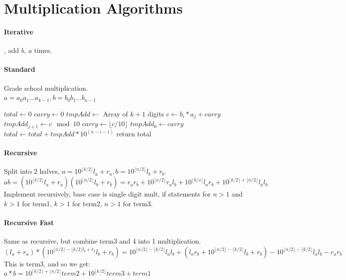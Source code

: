 \section{Multiplication Algorithms}
\paragraph{Iterative}, add $b$, $a$ times.
\vspace{-7 pt}
\paragraph{Standard} Grade school multiplication.\\
$a=a_0a_1\ldots a_{k-1},b=b_0b_1\ldots b_{n-1}$
\begin{algorithmic}
	\State $total \gets 0$
		\State $carry \gets 0$
		\State $tmpAdd \gets$ Array of $k+1$ digits
			\State $c\gets b_i*a_j+carry$
			\State $tmpAdd_{j+1}\gets c \mod 10$
			\State $carry \gets \lfloor c/10 \rfloor$
		\EndFor
		\State $tmpAdd_0 \gets carry$
		\State $total \gets total+tmpAdd*10^{(n-i-1)}$
	\EndFor
	\State return total
\end{algorithmic}
\vspace{-7 pt}
\paragraph{Recursive} Split into 2 halves, $a=10^{\lfloor k/2 \rfloor }l_a+r_a,b=10^{\lfloor n/2 \rfloor }l_b+r_b$.
\\$ab=(10^{\lfloor k/2 \rfloor}l_a+r_a)(10^{\lfloor n/2 \rfloor }l_b+r_b)=r_a r_b+10^{\lfloor n/2 \rfloor}r_al_b+10^{\lfloor k/s \rfloor}l_ar_b+10^{\lfloor k/2 \rfloor + \lfloor n/2 \rfloor }l_al_b$
\\ Implement recursively, base case is single digit mult, if statements for $n>1$ and $k>1$ for term1, $k>1$ for term2, $n>1$ for term3.
\vspace{-7 pt}
\paragraph{Recursive Fast} Same as recursive, but combine term3 and 4 into 1 multiplication.
\\$(l_a+r_a)*(10^{\lfloor n/2 \rfloor - \lfloor k/2 \rfloor l_b+r_b}l_b+r_b)=10^{\lfloor n/2 \rfloor - \lfloor k/2 \rfloor}l_al_b+(l_ar_b+10^{\lfloor n/2 \rfloor - \lfloor k/2 \rfloor}l_b+r_b)-10^{\lfloor n/2 \rfloor - \lfloor k/2 \rfloor}l_al_b-r_ar_b$
\\ This is term3, and so we get:
\\$a*b=10^{\lfloor k/2 \rfloor + \lfloor n/2 \rfloor}term2+10^{\lfloor k/2 \rfloor}term3+term1$
\color{Fuchsia}
